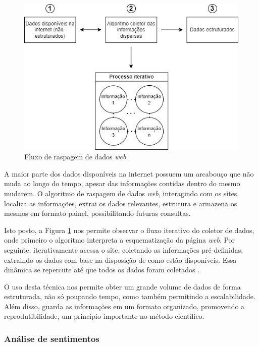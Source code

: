 \begin{figure}[htbp]
	\centering
	\caption{Fluxo de raspagem de dados \textit{web}} \label{figure:fluxo_web_scrap}
	\includegraphics[scale = 0.85]{figuras/web_scraping_flow.png}
\end{figure}

A maior parte dos dados disponíveis na internet possuem um arcabouço que não muda ao longo do tempo, apesar das informações contidas dentro do mesmo mudarem. O algoritmo de raspagem de dados \textit{web}, interagindo com os sites, localiza as informações, extrai os dados relevantes, estrutura e armazena os mesmos em formato painel, possibilitando futuras consultas.

Isto posto, a Figura \ref{figure:fluxo_web_scrap} nos permite observar o fluxo iterativo do coletor de dados, onde primeiro o algoritmo interpreta a esquematização da página \textit{web}. Por seguinte, iterativamente acessa o site, coletando as informações pré-definidas, extraindo os dados com base na disposição de como estão disponíveis. Essa dinâmica se repercute até que todos os dados foram coletados \cite{hc_costa2016}.

O uso desta técnica nos permite obter um grande volume de dados de forma estruturada, não só poupando tempo, como também permitindo a escalabilidade. Além disso, guarda as informações em um formato organizado, promovendo a reprodutibilidade, um princípio importante no método científico.

\subsubsection{Análise de sentimentos}

